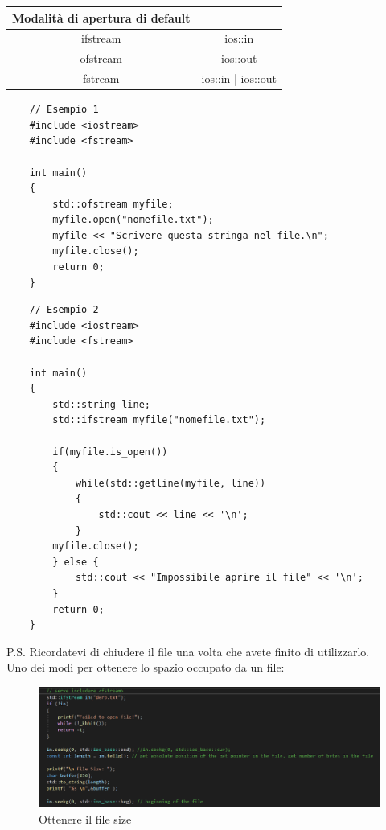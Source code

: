 \begin{tabular}{|c|c|}
	\hline
	\textbf{Modalità di apertura di default} & \textbf{} \\
	\hline
	\textsf{\small ifstream} & \textsf{\small ios::in} \\
	\textsf{\small ofstream} & \textsf{\small ios::out} \\
	\textsf{\small fstream} & \textsf{\small ios::in | ios::out} \\
	\hline
\end{tabular}

\begin{lstlisting}
	// Esempio 1
	#include <iostream>
	#include <fstream>
	
	int main()
	{
		std::ofstream myfile;
		myfile.open("nomefile.txt");
		myfile << "Scrivere questa stringa nel file.\n";
		myfile.close();
		return 0;
	}
\end{lstlisting}

\begin{lstlisting}
	// Esempio 2
	#include <iostream>
	#include <fstream>
	
	int main()
	{
		std::string line;
		std::ifstream myfile("nomefile.txt");
		
		if(myfile.is_open())
		{
			while(std::getline(myfile, line))
			{
				std::cout << line << '\n';
			}
		myfile.close();
		} else {
			std::cout << "Impossibile aprire il file" << '\n';
		}
		return 0;
	}
\end{lstlisting}

\textsf{\small P.S. Ricordatevi di chiudere il file una volta che avete finito di utilizzarlo.} \\

\textsf{\small Uno dei modi per ottenere lo spazio occupato da un file: } \\

\begin{figure}[ht]
	\centering
	\includegraphics[width=1.2\textwidth, height=1.2\textheight, keepaspectratio]{./imgs/fstream_file_size.png}
	\caption{Ottenere il file size}
	\label{fig:fstream_file_size}
\end{figure}


